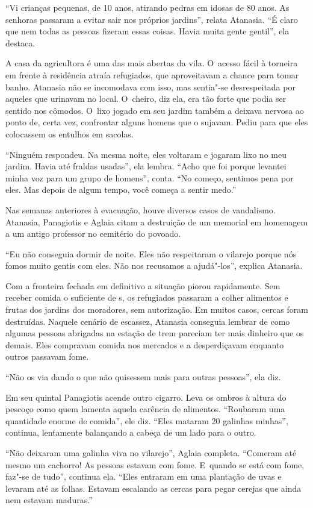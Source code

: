 ``Vi crianças pequenas, de 10 anos, atirando pedras em idosas de 80
anos. As senhoras passaram a evitar sair nos próprios jardins'', relata
Atanasia. ``É claro que nem todas as pessoas fizeram essas coisas. Havia
muita gente gentil'', ela destaca.

A casa da agricultora é uma das mais abertas da vila. O~acesso fácil à
torneira em frente à residência atraía refugiados, que aproveitavam a
chance para tomar banho. Atanasia não se incomodava com isso, mas
sentia"-se desrespeitada por aqueles que urinavam no local. O~cheiro, diz
ela, era tão forte que podia ser sentido nos cômodos. O~lixo jogado em
seu jardim também a deixava nervosa ao ponto de, certa vez, confrontar
alguns homens que o sujavam. Pediu para que eles colocassem os entulhos
em sacolas.

``Ninguém respondeu. Na mesma noite, eles voltaram e jogaram lixo no meu
jardim. Havia até fraldas usadas'', ela lembra. ``Acho que foi porque
levantei minha voz para um grupo de homens'', conta. ``No começo,
sentimos pena por eles. Mas depois de algum tempo, você começa a sentir
medo.''

Nas semanas anteriores à evacuação, houve diversos casos de vandalismo.
Atanasia, Panagiotis e Aglaia citam a destruição de um memorial em
homenagem a um antigo professor no cemitério do povoado.

``Eu não conseguia dormir de noite. Eles não respeitaram o vilarejo
porque nós fomos muito gentis com eles. Não nos recusamos a ajudá"-los'',
explica Atanasia.

Com a fronteira fechada em definitivo a situação piorou rapidamente.
Sem receber comida o suficiente de s, os refugiados passaram a colher
alimentos e frutas dos jardins dos moradores, sem autorização. Em muitos
casos, cercas foram destruídas. Naquele cenário de escassez, Atanasia
conseguia lembrar de como algumas pessoas abrigadas na estação de trem
pareciam ter mais dinheiro que os demais. Eles compravam comida nos
mercados e a desperdiçavam enquanto outros passavam fome.

``Não os via dando o que não quisessem mais para outras pessoas'', ela
diz.

Em seu quintal Panagiotis acende outro cigarro. Leva os ombros à altura
do pescoço como quem lamenta aquela carência de alimentos. ``Roubaram
uma quantidade enorme de comida'', ele diz. ``Eles mataram 20 galinhas
minhas'', continua, lentamente balançando a cabeça de um lado para o
outro.

``Não deixaram uma galinha viva no vilarejo'', Aglaia completa.
``Comeram até mesmo um cachorro! As pessoas estavam com fome. E~quando
se está com fome, faz"-se de tudo'', continua ela. ``Eles entraram em uma
plantação de uvas e levaram até as folhas. Estavam escalando as cercas
para pegar cerejas que ainda nem estavam maduras.''

